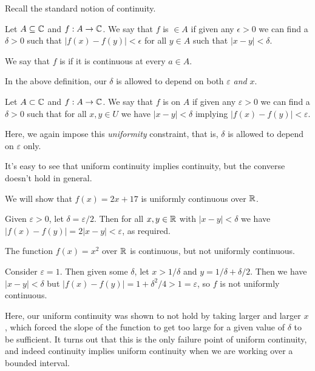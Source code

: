 \documentclass[a4paper]{scrartcl}
\begin{document}
Recall the standard notion of continuity.

\begin{definition}[Continuity]
	Let $A \subseteq \mathbb{C}$ and $f: A \rightarrow \mathbb{C}$. We say that $f$ is  $\in A$ if given any $\epsilon > 0$ we can find a $\delta > 0$ such that $|f(x) - f(y)| < \epsilon$ for all $y \in A$ such that $|x - y| < \delta$.


	We say that $f$ is  if it is continuous at every $a \in A$.
\end{definition}

In the above definition, our $\delta$ is allowed to depend on both $\varepsilon$ \emph{and} $x$.

\begin{definition}
    Let $A \subset \mathbb{C}$ and $f: A \rightarrow \mathbb{C}$. We say that $f$ is  on $A$ if given any $\varepsilon > 0$ we can find a $\delta > 0$ such that for all $x, y \in U$ we have $|x - y| < \delta$ implying $|f(x) - f(y)| < \varepsilon$.
\end{definition}

Here, we again impose this \emph{uniformity} constraint, that is, $\delta$ is allowed to depend on $\varepsilon$ only. 

It's easy to see that uniform continuity implies continuity, but the converse doesn't hold in general.

\begin{example}
    We will show that $f(x) = 2x + 17$ is uniformly continuous over $\mathbb{R}$. 

    Given $\varepsilon > 0$, let $\delta = \varepsilon / 2$. Then for all $x, y \in \mathbb{R}$ with $|x - y| < \delta$ we have $|f(x) - f(y)| = 2|x - y| < \varepsilon$, as required.
\end{example}

\begin{example}
    The function $f(x) = x^2$ over $\mathbb{R}$ is continuous, but not uniformly continuous. 

    Consider $\varepsilon = 1$. Then given some $\delta$, let $x > 1/\delta$ and $y = 1/\delta + \delta/2$. Then we have $|x - y| < \delta$ but $|f(x) - f(y)| = 1 + \delta^2/4 > 1 = \varepsilon$, so $f$ is not uniformly continuous.
\end{example}

Here, our uniform continuity was shown to not hold by taking larger and larger $x$, which forced the slope of the function to get too large for a given value of $\delta$ to be sufficient. It turns out that this is the only failure point of uniform continuity, and indeed continuity implies uniform continuity when we are working over a bounded interval.
\end{document}
